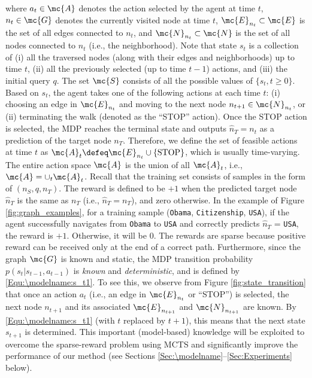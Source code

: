 \documentclass{article}
\begin{document}
    \noindent where $a_t \in \mc{A}$ denotes the action selected by the agent at time $t$, $n_t \in \mc{G}$ denotes the currently visited node at time $t$,  $\mc{E}_{n_t} \subset \mc{E}$ is the set of all edges connected to $n_t$, and $\mc{N}_{n_t} \subset \mc{N}$ is the set of all nodes connected to $n_t$ (i.e., the neighborhood). Note that state $s_t$ is a collection of (i) all the traversed nodes (along with their edges and neighborhoods) up to time $t$, (ii) all the previously selected (up to time $t-1$) actions, and (iii) the initial query $q$. The set $\mc{S}$ consists of all the possible values of $\{s_t, t \ge 0\}$. Based on $s_t$, the agent takes one of the following actions at each time $t$: (i) choosing an edge in $\mc{E}_{n_{t}}$ and moving to the next node $n_{t+1} \in \mc{N}_{n_{t}}$, or (ii) terminating the walk (denoted as the ``STOP'' action). Once the STOP action is selected, the MDP reaches the terminal state and outputs $\hat{n}_T = n_{t}$ as a prediction of the target node $n_T$. Therefore, we define the set of feasible actions at time $t$ as $\mc{A}_t \defeq \mc{E}_{n_t} \cup \{ \mathrm{STOP}\}$, which is usually time-varying. The entire action space $\mc{A}$ is the union of all $\mc{A}_t$, i.e., $\mc{A} = \cup_t \mc{A}_t$. Recall that the training set consists of samples in the form of $(n_S, q, n_T)$. The reward is defined to be $+1$ when the predicted target node $\hat{n}_T$ is the same as $n_T$ (i.e., $\hat{n}_T = n_T$), and zero otherwise. In the example of Figure \ref{fig:graph_examples}, for a training sample (\texttt{Obama}, \texttt{Citizenship}, \texttt{USA}), if the agent successfully navigates from \texttt{Obama} to \texttt{USA} and correctly predicts $\hat{n}_T$ = \texttt{USA}, the reward is $+1$. Otherwise, it will be $0$. The rewards are sparse because positive reward can be received only at the end of a correct path. Furthermore, since the graph $\mc{G}$ is known and static, the MDP transition probability $p(s_{t} | s_{t-1}, a_{t-1})$ is \emph{known} and \emph{deterministic}, and is defined by \eqref{Equ:\modelname:s_t1}. To see this, we observe from Figure \ref{fig:state_transition} that once an action $a_t$ (i.e., an edge in $\mc{E}_{n_t}$ or ``STOP'') is selected, the next node $n_{t+1}$ and its associated $\mc{E}_{n_{t+1}}$ and $\mc{N}_{n_{t+1}}$ are known. By \eqref{Equ:\modelname:s_t1} (with $t$ replaced by $t+1$), this means that the next state $s_{t+1}$ is determined. This important (model-based) knowledge will be exploited to overcome the sparse-reward problem using MCTS and significantly improve the performance of our method (see Sections \ref{Sec:\modelname}--\ref{Sec:Experiments} below). 
    
\end{document}
